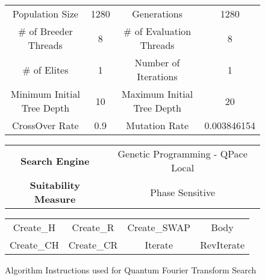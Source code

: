 \begin{figure}[h!]
\begin{center}
 \begin{tabular}{|cc|cc|}
\hline
  Population Size & 1280 & Generations & 1280 \\
  \# of Breeder Threads & 8 & \# of Evaluation Threads & 8 \\
  \# of Elites & 1 & Number of Iterations & 1 \\
  Minimum Initial Tree Depth & 10 & Maximum Initial Tree Depth & 20 \\
  CrossOver Rate & 0.9 & Mutation Rate & 0.003846154 \\
\hline
 \end{tabular}
 \begin{tabular}{cc}
  \textbf{Search Engine} & Genetic Programming - QPace Local \\
  \textbf{Suitability Measure} & Phase Sensitive \\
 \end{tabular}
 \begin{tabular}{|cccc|}
\hline
  Create\_H & Create\_R & Create\_SWAP & Body \\
  Create\_CH  & Create\_CR & Iterate & RevIterate\\
\hline
 \end{tabular}
\end{center}
\caption{Algorithm Instructions used for Quantum Fourier Transform Search}
\label{fig:qftparams}
\end{figure}


\clearpage
